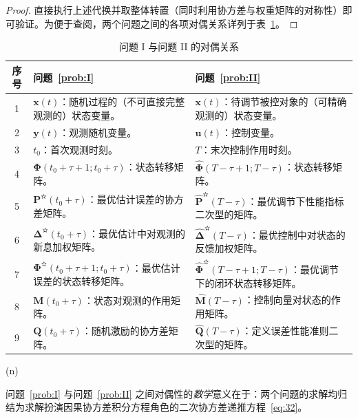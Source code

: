\begin{proof}

直接执行上述代换并取整体转置（同时利用协方差与权重矩阵的对称性）即可验证。为便于查阅，两个问题之间的各项对偶关系详列于表~\ref{tab:1}。

\end{proof}

\begin{table}[htbp]
\centering
\renewcommand{\arraystretch}{1.25}
\caption{问题 I 与问题 II 的对偶关系}\label{tab:1}
\begin{tabularx}{\textwidth}{cXX}
\toprule
序号 & 问题~\ref{prob:I} & 问题~\ref{prob:II} \\
\midrule
1 & $\bm{x}(t)$：随机过程的（不可直接完整观测的）状态变量。 & $\bm{x}(t)$：待调节被控对象的（可精确观测的）状态变量。 \\
2 & $\bm{y}(t)$：观测随机变量。 & $\bm{u}(t)$：控制变量。 \\
3 & $t_0$：首次观测时刻。 & $T$：末次控制作用时刻。 \\
4 & $\bm{\Phi}(t_0 + \tau + 1; t_0 + \tau)$：状态转移矩阵。 & $\hat{\bm{\Phi}}(T - \tau + 1; T - \tau)$：状态转移矩阵。 \\
5 & $\bm{P}^{\text{✫}}(t_0 + \tau)$：最优估计误差的协方差矩阵。 & $\hat{\bm{P}}^{\text{✫}}(T - \tau)$：最优调节下性能指标二次型的矩阵。 \\
6 & $\bm{\Delta}^{\text{✫}}(t_0 + \tau)$：最优估计中对观测的新息加权矩阵。 & $\hat{\bm{\Delta}}^{\text{✫}}(T - \tau)$：最优控制中对状态的反馈加权矩阵。 \\
7 & $\bm{\Phi}^{\text{✫}}(t_0 + \tau + 1; t_0 + \tau)$：最优估计误差的状态转移矩阵。 & $\hat{\bm{\Phi}}^{\text{✫}}(T - \tau + 1; T - \tau)$：最优调节下的闭环状态转移矩阵。 \\
8 & $\bm{M}(t_0 + \tau)$：状态对观测的作用矩阵。 & $\hat{\bm{M}}(T - \tau)$：控制向量对状态的作用矩阵。 \\
9 & $\bm{Q}(t_0 + \tau)$：随机激励的协方差矩阵。 & $\hat{\bm{Q}}(T - \tau)$：定义误差性能准则二次型的矩阵。 \\
\bottomrule
\end{tabularx}
\end{table}

\begin{remarkn}{(n)}\label{rem:n}

问题~\ref{prob:I} 与问题~\ref{prob:II} 之间对偶性的\emph{数学}意义在于：两个问题的求解均归结为求解扮演因果协方差积分方程角色的二次协方差递推方程~\eqref{eq:32}。

\end{remarkn}

